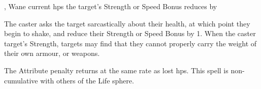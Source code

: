   {\mEarth,\mWater}%
  {Wane}%
  {}%
  {current \glspl{hp}}%
  {the target's Strength or Speed Bonus reduces by }%
  {
    The caster asks the target sarcastically about their health, at which point they begin to shake, and reduce their Strength or Speed Bonus by 1.
    When the caster target's Strength, targets may find that they cannot properly carry the weight of their own armour, or weapons.

    The Attribute penalty returns at the same rate as lost \glspl{hp}.
    This spell is non-cumulative with others of the Life sphere.
  }

